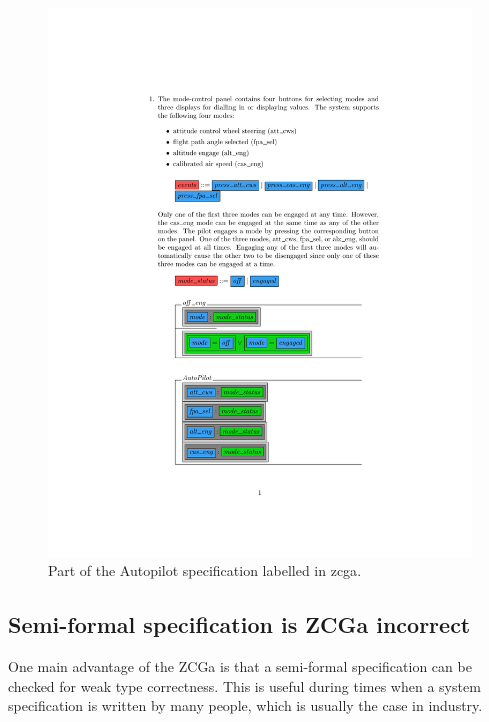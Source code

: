 \begin{figure}[H]
\centering
\includegraphics[clip, trim=3.5cm 10cm 1.5cm 2cm, scale=0.7]{examples/semiform/1.pdf}
\caption{Part of the Autopilot specification labelled in \gls{zcga}. \label{fig:zcgautopilot}}
\end{figure}

\subsection{Semi-formal specification is ZCGa incorrect}

One main advantage of the ZCGa is that a semi-formal specification
can be checked for weak type correctness. This is useful during times when a  system
specification is written by many people, which is usually the case in industry.

